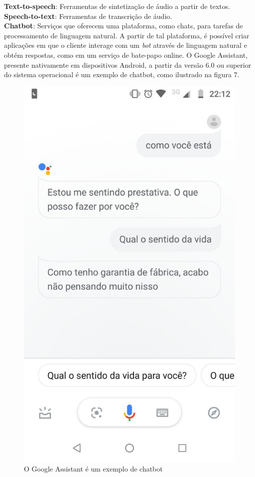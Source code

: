 \documentclass{article}
\begin{document}
\textbf{Text-to-speech}: Ferramentas de sintetização de áudio a partir de textos. \\
\textbf{Speech-to-text}: Ferramentas de transcrição de áudio. \\
\textbf{Chatbot}: Serviços que oferecem uma plataforma, como chats, para tarefas de processamento de linguagem natural. A partir de tal plataforma, é possível criar aplicações em que o cliente interage com um \textit{bot} através de linguagem natural e obtém respostas, como em um serviço de bate-papo online. O Google Assistant, presente nativamente em dispositivos Android, a partir da versão 6.0 ou superior do sistema operacional é um exemplo de chatbot, como ilustrado na figura 7.\\
\begin{figure}[H]
    \centering
    \includegraphics[scale=0.3]{imagens/chatbot.jpg}
    \caption{O Google Assistant é um exemplo de chatbot}
    \label{fig:chatbot}
\end{figure}{}
\end{document}
